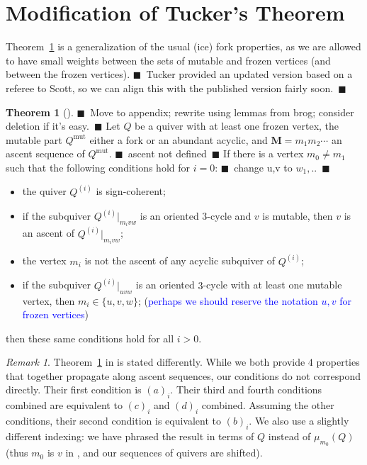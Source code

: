 \documentclass[12pt]{amsart}
\def\AB#1{(\textcolor{blue}{#1})}
\newcommand{\cS}[1]{{\noindent\textsf{\color{purple}$\blacksquare$~#1~$\blacksquare$}}}
\theoremstyle{definition}
\newtheorem{theorem}[thm]{Theorem} %
\theoremstyle{remark}
\newtheorem{rem}[thm]{Remark}
\numberwithin{equation}{section}
\newcommand{\mut} {\text{mut}}
\begin{document}
\iffalse
\appendix
\section{Modification of Tucker's Theorem}
\label{app: tucker's theorem}

Theorem~\ref{thm:ervinSignCoherence} is a generalization of the usual (ice) fork properties, as we are allowed to have small weights between the sets of mutable and frozen vertices (and between the frozen vertices). \cS{Tucker provided an updated version based on a referee to Scott, so we can align this with the published version fairly soon.}

\pagebreak[2]

\begin{theorem}[{\cite[Lemma~5.4]{ErvinRS}}] %
\label{thm:ervinSignCoherence}
\cS{Move to appendix; rewrite using lemmas from brog; consider deletion if it's easy.}
Let $Q$ be a quiver with at least one frozen vertex, the mutable part $Q^{\mut}$ either a fork or an abundant acyclic, and $\mathbf M = m_1 m_2\cdots$ an ascent sequence of $Q^{\mut}$. \cS{ascent not defined} %
If there is a vertex $m_0 \neq m_1$ such that the following conditions hold for $i = 0$: \cS{change u,v to $w_1,..$}
\begin{itemize}
    \item[$(a)_i$] the quiver $Q^{(i)}$ is sign-coherent;
    \item[$(b)_i$] if the subquiver $Q^{(i)}|_{m_ivw}$ is an oriented $3$-cycle and $v$ is mutable, then $v$ is an ascent of $Q^{(i)}|_{m_ivw}$; 
    \item[$(c)_i$] the vertex $m_i$ is not the ascent of any acyclic subquiver of $Q^{(i)}$;
    \item[$(d)_i$] if the subquiver $Q^{(i)}|_{uvw}$ is an oriented $3$-cycle with at least one mutable vertex, then $m_i \in \{u,v,w\}$;  \AB{perhaps we should reserve the notation $u,v$ for frozen vertices}
\end{itemize}
then these same conditions hold for all $i > 0$.
\end{theorem}


\begin{rem}
Theorem~\ref{thm:ervinSignCoherence} in \cite{ErvinRS} is stated differently. 
While we both provide $4$ properties that together propagate along ascent sequences, our conditions do not correspond directly. 
Their first condition is $(a)_i$.
Their third and fourth conditions combined are equivalent to $(c)_i$ and $(d)_i$ combined.
Assuming the other conditions, their second condition is equivalent to $(b)_i$.
We also use a slightly different indexing:
we have phrased the result in terms of $Q$ instead of $\mu_{m_0}(Q)$ (thus $m_0$ is $v$ in \cite{ErvinRS}, and our sequences of quivers are shifted).
\end{rem}
\end{document}
